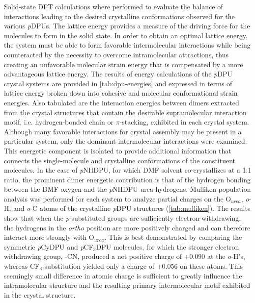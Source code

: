 Solid-state DFT calculations where performed to evaluate the balance of interactions leading to the desired crystalline conformations observed for the various \textit{p}DPUs. The lattice energy provides a measure of the driving force for the molecules to form in the solid state. In order to obtain an optimal lattice energy, the system must be able to form favorable intermolecular interactions while being counteracted by the necessity to overcome intramolecular attractions, thus creating an unfavorable molecular strain energy that is compensated by a more advantageous lattice energy. The results of energy calculations of the \textit{p}DPU crystal systems are provided in \autoref{tab:dpu-energies} and expressed in terms of lattice energy broken down into cohesive and molecular conformational strain energies. Also tabulated are the interaction energies between dimers extracted from the crystal structures that contain the desirable supramolecular interaction motif, i.e. hydrogen-bonded chain or $\pi$-stacking, exhibited in each crystal system. Although many favorable interactions for crystal assembly may be present in a particular system, only the dominant intermolecular interactions were examined. This energetic component is isolated to provide additional information that connects the single-molecule and crystalline conformations of the constituent molecules. In the case of \textit{p}NHDPU, for which DMF solvent co-crystallizes at a 1:1 ratio, the prominent dimer energetic contribution is that of the hydrogen bonding between the DMF oxygen and the \textit{p}NHDPU urea hydrogens. Mulliken population analysis was performed for each system to analyze partial charges on the O$_{urea}$, \textit{o}-H, and \textit{o}-C atoms of the crystalline \textit{p}DPU structures (\autoref{tab:mulliken}). The results show that when the \textit{p}-substituted groups are sufficiently electron-withdrawing, the hydrogens in the \textit{ortho} position are more positively charged and can therefore interact more strongly with O$_{urea}$. This is best demonstrated by comparing the symmetric \textit{p}CyDPU and \textit{p}CF$_{3}$DPU molecules, for which the stronger electron withdrawing group, -CN, produced a net positive charge of +0.090 at the \textit{o}-H's, whereas CF$_{3}$ substitution yielded only a charge of +0.056 on these atoms. This seemingly small difference in atomic charge is sufficient to greatly influence the intramolecular structure and the resulting primary intermolecular motif exhibited in the crystal structure. 


